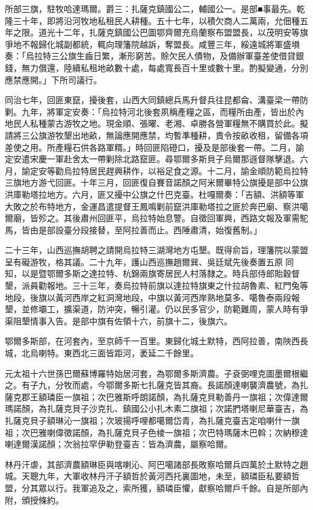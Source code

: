 \begin{pinyinscope}
所部三旗，駐牧哈達瑪爾。爵三：扎薩克鎮國公二，輔國公一。是部■事最先。乾隆三十年，即將沿河牧地私租民人耕種。五十七年，以積欠商人二萬兩，允佃種五年之限。道光十二年，扎薩克鎮國公巴圖鄂齊爾充烏蘭察布盟盟長，以茂明安等旗爭地不報歸化城副都統，輒向理籓院越訴，奪盟長。咸豐三年，綏遠城將軍盛塤奏：「烏拉特三公旗生齒日繁，漸形窮苦。賒欠民人債物，及備辦軍臺差使借貸銀錢，無力償還，陸續私租地畝數十處，每處寬長百十里或數十里。酌擬變通，分別應禁應開。」下所司議行。

同治七年，回匪東竄，擾後套，山西大同鎮總兵馬升督兵往昆都侖、溝臺梁一帶防剿。九年，將軍定安奏：「烏拉特河北後套夙稱產糧之區，而糧所由產，皆出於內地民人私種蒙古游牧之地。現金順、張曜、老湘、卓勝各營軍糧無不購買於此。擬請將三公旗游牧墾出地畝，無論應開應禁，均暫準種耕，責令按畝收租，留備各項差使之用。所產糧石供各路軍糈。」時回匪陷磴口，擾及是部後套一帶。二月，諭定安遣宋慶一軍赴舍太一帶剿除北路竄匪。尋鄂爾多斯貝子烏爾那遜督隊擊退。六月，諭定安等勸烏拉特居民趕興耕作，以裕足食之源。十二月，諭金順防範烏拉特三旗地方游弋回匪。十年三月，回匪復自賽音諾顏之阿米爾畢特公旗擾是部中公旗洪庫勒塔拉地方。六月，匪又擾中公旗之什巴克臺。杜嘎爾奏：「吉額、洪額等軍大敗之於布特地方，金運昌遣提督王鳳鳴剿前竄洪庫勒塔拉之匪於奔巴廟、察洪噶爾廟，皆殄之。其後肅州回匪平，烏拉特始息警。自徵回軍興，西路文報及軍需駝馬，皆由是部設臺分段接替，至阿拉善而止。西陲肅清，始復舊制。」

二十三年，山西巡撫胡聘之請開烏拉特三湖灣地方屯墾。既得俞旨，理籓院以蒙盟呈有礙游牧，格其議。二十九年，護山西巡撫趙爾巽、吳廷斌先後奏置五原同知，以是暨鄂爾多斯之達拉特、杭錦兩旗寄居民人村落隸之。時兵部侍郎貽穀督墾，派員勸報地。三十三年，奏烏拉特前旗以達拉特旗東之什拉胡魯素、紅門兔等地段，後旗以黃河西岸之紅洞灣地段，中旗以黃河西岸熟地莫多、噶魯泰兩段報墾，並修壩工，擴渠道，防沖突，暢引灌。仍以民多官少，防範難周，蒙人時有爭渠阻墾情事入告。是部中旗有佐領十六，前旗十二，後旗六。

鄂爾多斯部，在河套內，至京師千一百里。東歸化城土默特，西阿拉善，南陜西長城，北烏喇特。東西北三面皆距河，袤延二千餘里。

元太祖十六世孫巴爾蘇博羅特始居河套，為鄂爾多斯濟農。子袞弼哩克圖墨爾根繼之。有子九，分牧而處，今鄂爾多斯七扎薩克皆其裔。長諾顏達喇襲濟農號，為扎薩克郡王額璘臣一旗祖；次巴雅斯呼朗諾顏，為扎薩克貝勒善丹一旗祖；次偉達爾瑪諾顏，為扎薩克貝子沙克扎、鎮國公小扎木素二旗祖；次諾捫塔喇尼華臺吉，為扎薩克貝子額琳沁一旗祖；次玻揚呼哩都噶爾岱青，為扎薩克臺吉定咱喇什一旗祖；次巴雅喇偉徵諾顏，為扎薩克貝子色棱一旗祖；次巴特瑪薩木巴斡；次納穆達喇達爾漢諾顏；次翁拉罕伊勒登臺吉：皆為濟農，屬察哈爾。

林丹汗虐，其部濟農額琳臣與喀喇沁、阿巴噶諸部長敗察哈爾兵四萬於土默特之趙城。天聰九年，大軍收林丹汗子額哲於黃河西托裏圖地，未至，額璘臣私要額哲盟，分其眾以行。我軍追及之，索所獲，額璘臣懼，獻察哈爾戶千餘。自是所部內附，頒授條約。


\end{pinyinscope}
